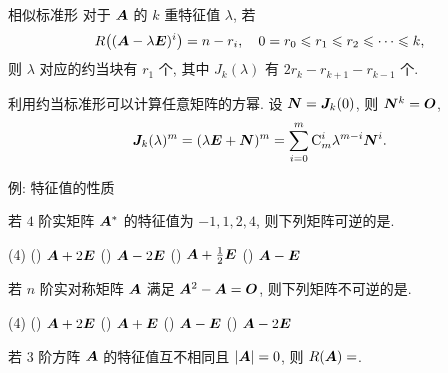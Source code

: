 \begin{frame}{相似标准形\noexer}
	\onslide<+->
	对于 ${\boldsymbol{A}}$ 的 $k$ 重特征值 $\lambda$,
	\onslide<+->
	若
	\[R\bigl(({\boldsymbol{A}}-\lambda{\boldsymbol{E}})^i\bigr)=n-r_i,\quad
	0=r_0\leqslant r_1\leqslant r_2\leqslant \cdots\leqslant k,\]
	\onslide<+->
	则 $\lambda$ 对应的约当块有 $r_1$ 个, 其中 $J_k(\lambda)$ 有 $2r_k-r_{k+1}-r_{k-1}$ 个.
	
	\onslide<+->
	利用约当标准形可以计算任意矩阵的方幂.
	\onslide<+->
	设 ${\boldsymbol{N}}={\boldsymbol{J}}_k(0)$, 则 ${\boldsymbol{N}}^k={\boldsymbol{O}}$,
	\[{\boldsymbol{J}}_k(\lambda)^m
	=(\lambda{\boldsymbol{E}}+{\boldsymbol{N}})^m=\sum_{i=0}^m {\mathrm{C}}_m^i \lambda^{m-i}{\boldsymbol{N}}^i.\]
\end{frame}


\begin{frame}{例: 特征值的性质}
	\onslide<+->
	\begin{exercise}
		若 $4$ 阶实矩阵 ${\boldsymbol{A}}^*$ 的特征值为 $-1,1,2,4$, 则下列矩阵可逆的是.
		
		\begin{taskschoice}(4)
			() ${\boldsymbol{A}}+2{\boldsymbol{E}}$
			() ${\boldsymbol{A}}-2{\boldsymbol{E}}$
			() ${\boldsymbol{A}}+\frac12{\boldsymbol{E}}$
			() ${\boldsymbol{A}}-{\boldsymbol{E}}$
		\end{taskschoice}
	\end{exercise}
	\onslide<+->
	\begin{exercise}
		若 $n$ 阶实对称矩阵 ${\boldsymbol{A}}$ 满足 ${\boldsymbol{A}}^2-{\boldsymbol{A}}={\boldsymbol{O}}$, 则下列矩阵不可逆的是\fillbrace{\visible<+->{C}}.
		
		\begin{taskschoice}(4)
			() ${\boldsymbol{A}}+2{\boldsymbol{E}}$
			() ${\boldsymbol{A}}+{\boldsymbol{E}}$
			() ${\boldsymbol{A}}-{\boldsymbol{E}}$
			() ${\boldsymbol{A}}-2{\boldsymbol{E}}$
		\end{taskschoice}
	\end{exercise}
	\onslide<+->
	\begin{exercise}
		若 $3$ 阶方阵 ${\boldsymbol{A}}$ 的特征值互不相同且 $|{\boldsymbol{A}}|=0$, 则 $R({\boldsymbol{A}})=$\fillblank{\visible<+->{$2$}}.
	\end{exercise}
\end{frame}


